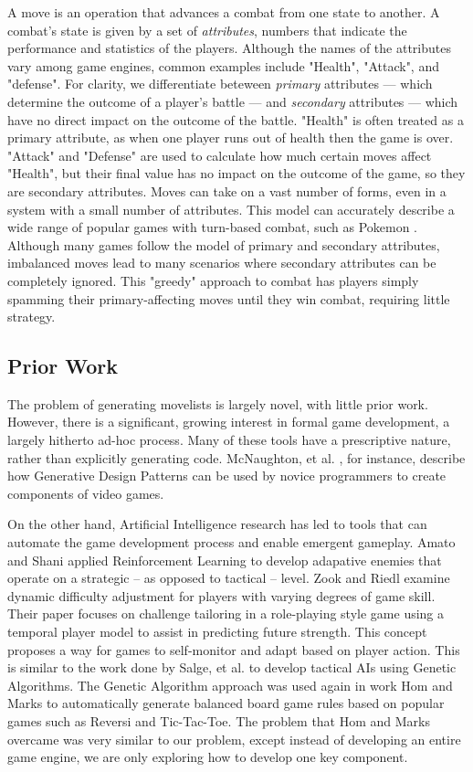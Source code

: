 \documentclass{acm_proc_article-sp}
\begin{document}
A move is an operation that advances a combat from one state to another. A combat's state is given by a set of \textit{attributes}, numbers that indicate the performance and statistics of the players. Although the names of the attributes vary among game engines, common examples include "Health", "Attack", and "defense". For clarity, we differentiate beteween \textit{primary} attributes --- which determine the outcome of a player's battle --- and \textit{secondary} attributes --- which have no direct impact on the outcome of the battle. "Health" is often treated as a primary attribute, as when one player runs out of health then the game is over. "Attack" and "Defense" are used to calculate how much certain moves affect "Health", but their final value has no impact on the outcome of the game, so they are secondary attributes. Moves can take on a vast number of forms, even in a system with a small number of attributes. This model can accurately describe a wide range of popular games with turn-based combat, such as Pokemon \cite{website:pokemon_calculations}. Although many games follow the model of primary and secondary attributes, imbalanced moves lead to many scenarios where secondary attributes can be completely ignored. This "greedy" approach to combat has players simply spamming their primary-affecting moves until they win combat, requiring little strategy.

\subsection{Prior Work}

The problem of generating movelists is largely novel, with little prior work. However, there is a significant, growing interest in formal game development, a largely hitherto ad-hoc process. Many of these tools have a prescriptive nature, rather than explicitly generating code. McNaughton, et al. \cite{generative_design_patterns}, for instance, describe how Generative Design Patterns can be used by novice programmers to create components of video games.

On the other hand, Artificial Intelligence research has led to tools that can automate the game development process and enable emergent gameplay. Amato and Shani\cite{reinforcement-strategy} applied Reinforcement Learning to develop adapative enemies that operate on a strategic -- as opposed to tactical -- level. Zook and Riedl \cite{dynamic_difficulty} examine dynamic difficulty adjustment for players with varying degrees of game skill. Their paper focuses on challenge tailoring in a role-playing style game using a temporal player model to assist in predicting future strength. This concept proposes a way for games to self-monitor and adapt based on player action. This is similar to the work done by Salge, et al. to develop tactical AIs using Genetic Algorithms\cite{genetic-ai}. The Genetic Algorithm approach was used again in work Hom and Marks\cite{balanced-board-games} to automatically generate balanced board game rules based on popular games such as Reversi and Tic-Tac-Toe. The problem that Hom and Marks overcame was very similar to our problem, except instead of developing an entire game engine, we are only exploring how to develop one key component.
\end{document}
